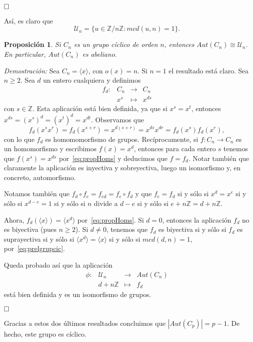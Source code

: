 \documentclass[12pt]{article}
\newtheorem{proposition}[theorem]{Proposición}
\begin{document}
$\hfill \square$

Así, es claro que $$\mathcal{U}_n = \lbrace u \in \mathbb{Z}/n\mathbb{Z}:mcd(u,n)=1 \rbrace.$$

\begin{proposition}Si $C_n$ es un grupo cíclico de orden $n$, entonces $Aut(C_n) \cong \mathcal{U}_n$. En particular, $Aut(C_n)$ es abeliano.
\end{proposition}
\emph{Demostración: }Sea $C_n = \langle x \rangle$, con $o(x)=n$. Si $n = 1$ el resultado está claro. Sea $n \geq 2$. Sea $d$ un entero cualquiera y definimos $$\begin{array}{rccl}
f_d \colon &C_n&\longrightarrow &C_n \\
&x^s& \longmapsto &x^{ds}
\end{array}
$$
con $s \in \mathbb{Z}$. Esta aplicación está bien definida, ya que si $x^s = x^t$, entonces $x^{ds}= (x^s)^d=(x^t)^d= x^{dt}$. Observamos que $$f_d(x^sx^r)=f_d(x^{s+r})=x^{d(s+r)} = x^{ds}x^{dr} = f_d(x^s)f_d(x^r),$$ con lo que $f_d$ es homomomorfismo de grupos. Recíprocamente, si $f \colon C_n \longrightarrow C_n$ es un homomorfismo y escribimos $f(x)=x^d$, entonces para cada entero $s$ tenemos que $f(x^s) = x^{ds}$ por~\ref{eq:propHoms} y deducimos que $f=f_d$. Notar también que claramente la aplicación es inyectiva y sobreyectiva, luego un isomorfismo y, en concreto, automorfismo.

Notamos también que $f_d \circ f_e = f_{ed} = f_e \circ f_d$ y que $f_e = f_d$ si y sólo si $x^d = x^e$ si y sólo si $x^{d-e}=1$ si y sólo si $n$ divide a $d-e$ si y sólo si $e+n\mathbb{Z} = d+n\mathbb{Z}.$

Ahora, $f_d( \langle x \rangle ) = \langle x^d \rangle$ por~\ref{eq:propHoms}. Si $d = 0$, entonces la aplicación $f_d$ no es biyectiva (pues $n\geq 2$). Si $d \neq 0$, tenemos que $f_d$ es biyectiva si y sólo si $f_d$ es suprayectiva si y sólo si $\langle x^d \rangle = \langle x \rangle$ si y sólo si $mcd(d,n)=1$, por~\ref{eq:prelgrupcic}.

Queda probado así que la aplicación$$\begin{array}{rccl}
\phi \colon &\mathcal{U}_n&\longrightarrow &Aut(C_n) \\
&d+n\mathbb{Z}& \longmapsto &f_d
\end{array}
$$ está bien definida y es un isomorfismo de grupos.

$\hfill \square$

Gracias a estos dos últimos resultados concluimos que $|Aut(C_p)| = p-1$. De hecho, este grupo es cíclico. 
\end{document}
